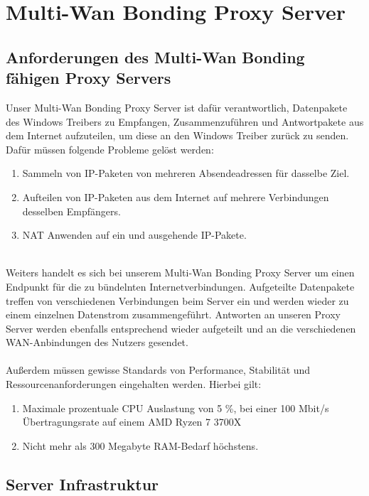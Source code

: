 \chapter{Multi-Wan Bonding Proxy Server}
\label{cha:Server}

\section{Anforderungen des Multi-Wan Bonding fähigen Proxy Servers}
Unser Multi-Wan Bonding Proxy Server ist dafür verantwortlich, Datenpakete des Windows Treibers zu Empfangen, Zusammenzuführen und Antwortpakete aus dem Internet aufzuteilen, um diese an den Windows Treiber zurück zu senden. Dafür müssen folgende Probleme gelöst werden:
\\
\begin{enumerate}
    \item Sammeln von IP-Paketen von mehreren Absendeadressen für dasselbe Ziel.
    \item Aufteilen von IP-Paketen aus dem Internet auf mehrere Verbindungen desselben Empfängers.
    \item NAT Anwenden auf ein und ausgehende IP-Pakete.
\end{enumerate}
\ \\
Weiters handelt es sich bei unserem Multi-Wan Bonding Proxy Server um einen Endpunkt für die zu bündelnten Internetverbindungen. Aufgeteilte Datenpakete treffen von verschiedenen Verbindungen beim Server ein und werden wieder zu einem einzelnen Datenstrom zusammengeführt. Antworten an unseren Proxy Server werden ebenfalls entsprechend wieder aufgeteilt und an die verschiedenen WAN-Anbindungen des Nutzers gesendet. 
\\\\
Außerdem müssen gewisse Standards von Performance, Stabilität und Ressourcenanforderungen eingehalten werden. Hierbei gilt:
\\
\begin{enumerate}
    \item Maximale prozentuale CPU Auslastung von 5 {\%}, bei einer 100 Mbit/s Übertragungsrate auf einem AMD Ryzen 7 3700X
    \item Nicht mehr als 300 Megabyte RAM-Bedarf höchstens.
\end{enumerate}

\section{Server Infrastruktur}
